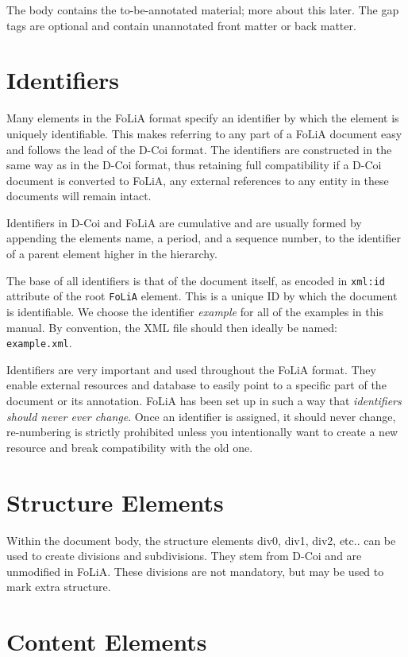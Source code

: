 \documentclass[a4paper,12pt]{report}
\begin{document}
The body contains the to-be-annotated material; more about this later. The gap tags are optional and contain unannotated front matter or back matter. \cite{DCOI}

\section{Identifiers}

Many elements in the FoLiA format specify an identifier by which the element is uniquely identifiable. This makes referring to any part of a FoLiA document easy and follows the lead of the D-Coi format. The identifiers are constructed in the same way as in the D-Coi format, thus retaining full compatibility if a D-Coi document is converted to FoLiA, any external references to any entity in these documents will remain intact.

Identifiers in D-Coi and FoLiA are cumulative and are usually formed by appending the elements name, a period, and a sequence number, to the identifier of a parent element higher in the hierarchy.

The base of all identifiers is that of the document itself, as encoded in \texttt{xml:id} attribute of the root \texttt{FoLiA} element. This is a unique ID by which the document is identifiable. We choose the identifier \emph{example} for all of the examples in this manual. By convention, the XML file should then ideally be named: \texttt{example.xml}.

Identifiers are very important and used throughout the FoLiA format. They enable external resources and database to easily point to a specific part of the document or its annotation. FoLiA has been set up in such a way that \emph{identifiers should never ever change}. Once an identifier is assigned, it should never change, re-numbering is strictly prohibited unless you intentionally want to create a new resource and break compatibility with the old one.


\section{Structure Elements}

Within the document body, the structure elements div0, div1, div2, etc.. can be used to create divisions and subdivisions. They stem from D-Coi and are unmodified in FoLiA. These divisions are not mandatory, but may be used to mark extra structure.

\section{Content Elements}
\end{document}

